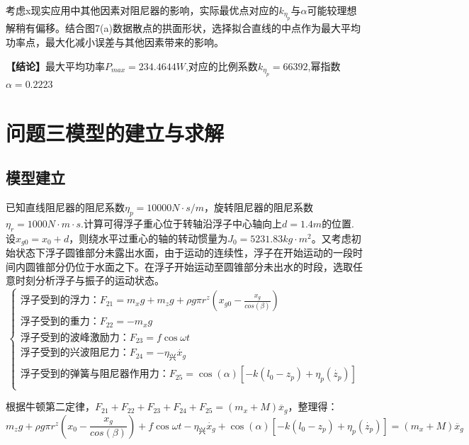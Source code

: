 \documentclass{article}
\numberwithin{equation}{subsection}
\begin{document}
考虑x现实应用中其他因素对阻尼器的影响，实际最优点对应的$k_{\eta_p}$与$\alpha$可能较理想解稍有偏移。结合图7(a)数据散点的拱面形状，选择拟合直线的中点作为最大平均功率点，最大化减小误差与其他因素带来的影响。

\textbf{【结论】}最大平均功率$P_{max}=234.4644W$,对应的比例系数$k_{\eta_p}=66392$,幂指数$\alpha=0.2223$






{\centering\section{问题三模型的建立与求解}}

\subsection{模型建立}
已知直线阻尼器的阻尼系数$\eta _{p}=10000 N·s/m$，旋转阻尼器的阻尼系数$\eta_r=1000 N·m·s$.计算可得浮子重心位于转轴沿浮子中心轴向上$d=1.4m$的位置.设$x_{g0}=x_0+d$，则绕水平过重心的轴的转动惯量为$J_0=5231.83 kg·m^2$。又考虑初始状态下浮子圆锥部分未露出水面，由于运动的连续性，浮子在开始运动的一段时间内圆锥部分仍位于水面之下。在浮子开始运动至圆锥部分未出水的时段，选取任意时刻分析浮子与振子的运动状态。
\begin{equation}
\left\{\begin{array}{l}
   \text{浮子受到的浮力：}F_{21}=m_{x} g +m_{z} g+\rho g \pi r^{z}\left(x_{g0}-\frac{x_g}{cos(\beta)}\right)\\
   \text{浮子受到的重力：}F_{22}=-m_{x} g\\
   \text{浮子受到的波峰激励力：}F_{23}=f \cos \omega t\\
   \text{浮子受到的兴波阻尼力：}F_{24}=-\eta_{\text{兴}} \dot{x_g}\\
   \text{浮子受到的弹簧与阻尼器作用力：}F_{25}=\cos(\alpha)[-k\left(l_{0}-z_p\right)+\eta_{p}(\dot{z_p})]\\
\end{array}\right.
\end{equation}

根据牛顿第二定律，$F_{21}+F_{22}+F_{23}+F_{24}+F_{25}=(m_x+M)\ddot{x_g}$，整理得：
\begin{equation}
m_{z} g+\rho g \pi r^{z}\left(x_{0}-\frac{x_g}{cos(\beta)}\right)+f \cos \omega t-\eta_{\text{兴}} \dot{x_g}+\cos(\alpha)[-k\left(l_{0}-z_p\right)+\eta_{p}(\dot{z_p})]=\left(m_{x}+M\right) \ddot{x_g}
\end{equation}
\end{document}
